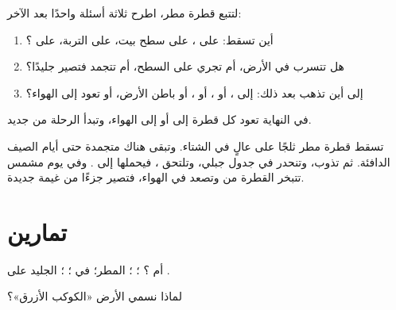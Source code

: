 \begin{method}\label{met:g2:water-on-earth:drop}
لتتبع قطرة مطر، اطرح ثلاثة أسئلة واحدًا بعد الآخر:
\begin{enumerate}
  \item أين تسقط: على ، على سطح بيت، على التربة، على
        ؟
  \item هل تتسرب في الأرض، أم تجري على السطح، أم تتجمد
        فتصير جليدًا؟
  \item إلى أين تذهب بعد ذلك: إلى ، أو ، أو ، أو باطن الأرض،
        أو تعود إلى الهواء؟
\end{enumerate}
في النهاية تعود كل قطرة إلى  أو إلى الهواء، وتبدأ الرحلة من
جديد.
\end{method}

\begin{example}\label{ex:g2:water-on-earth:mountain}
تسقط قطرة مطر ثلجًا على  عالٍ في الشتاء. وتبقى هناك متجمدة حتى أيام
الصيف الدافئة. ثم تذوب، وتنحدر في جدول جبلي، وتلتحق ، فيحملها 
إلى . وفي يوم مشمس تتبخر القطرة من  وتصعد في الهواء، فتصير
جزءًا من غيمة جديدة.
\end{example}

\section{تمارين}

\begin{exercise}[$\star$]\label{exo:g2:water-on-earth:1}
 أم ؟ ؛ ؛ المطر؛  في ؛ ؛ الجليد
على .
\end{exercise}

\begin{exercise}[$\star$]\label{exo:g2:water-on-earth:2}
لماذا نسمي الأرض «الكوكب الأزرق»؟
\end{exercise}

